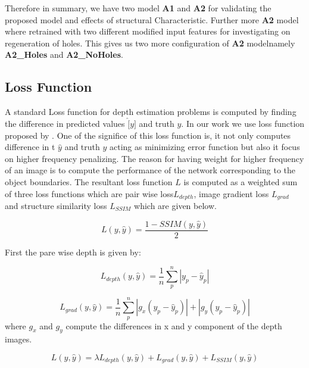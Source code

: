 Therefore in summary, we have two model \textbf{A1} and \textbf{A2} for validating the proposed model and effects of structural Characteristic. Further more \textbf{A2} model where retrained with two different modified input features for investigating on regeneration of holes. This gives us two more configuration of \textbf{A2} modelnamely \textbf{A2\_Holes} and \textbf{A2\_NoHoles}. 

\subsection{Loss Function}
A standard Loss function for depth estimation problems is computed by finding the difference in predicted values \(\hat[y]\) and truth \(y\). In our work we use loss function proposed by \cite{Alhashim2018}. One of the significe of this loss function is, it not only computes difference in t \(\hat{y}\) and truth \(y\) acting as minimizing error function but also it focus on higher frequency penalizing. The reason for having weight for higher frequency of an image is to compute the performance of the network corresponding to the object boundaries. The resultant loss function \(L\) is computed as a weighted sum of three loss functions which are pair wise loss\(L_{depth}\), image gradient loss \(L_{grad}\) and structure similarity loss  \(L_{SSIM}\) which are given below.

\begin{equation} \label{eq:lossdepth}
       L(y, \hat{y}) = \frac{1- SSIM(y, \hat{y})}{2}
\end{equation}

First the pare wise depth is given by:

\begin{equation} \label{eq:lossdepth}
      L_{depth}(y, \hat{y})= \frac{1}{n} \sum_{p}^{n} \left|y_{p} - \hat{y}_{p} \right|
\end{equation}



\begin{equation} \label{eq:lossdepth}
       L_{grad}(y, \hat{y}) =  \frac{1}{n} \sum_{p}^{n} \left| g_{x} (y_{p} - \hat{y}_{p}) \right| + \left| g_{y} (y_{p} - \hat{y}_{p}) \right|
\end{equation}
where \(g_{x}\) and \(g_{y}\) compute the differences in x and y component of the depth images. 





\begin{equation} \label{eq:loss}
       L(y, \hat{y}) = \lambda L_{depth}(y, \hat{y}) + L_{grad}(y, \hat{y}) + L_{SSIM}(y, \hat{y})
\end{equation}

